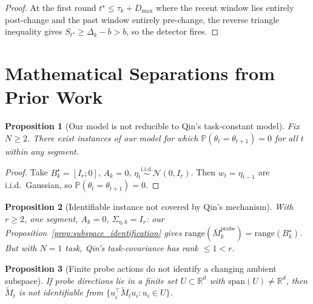 \documentclass{article}
\newcommand{\R}{\mathbb{R}}
\newcommand{\Prob}{\mathbb{P}}
\newcommand{\range}{\mathrm{range}}
\newcommand{\Span}{\mathrm{span}}
\newtheorem{proposition}{Proposition}
\begin{document}
\begin{proof}
At the first round $t^\star \le \tau_k + D_{\max}$ where the recent window lies entirely post-change and the past window entirely pre-change, the reverse triangle inequality gives $S_{t^\star} \ge \Delta_k - b > b$, so the detector fires.
\end{proof}

\section{Mathematical Separations from Prior Work}
\label{app:separation}

\begin{proposition}[Our model is not reducible to Qin's task-constant model]
\label{prop:separation_qin_1}
Fix $N\ge 2$. There exist instances of our model for which $\Prob(\theta_t = \theta_{t+1}) = 0$ for all $t$ within any segment.
\end{proposition}

\begin{proof}
Take $B_k^\star = [I_r; 0]$, $A_k = 0$, $\eta_t \stackrel{\mathrm{i.i.d.}}{\sim} \mathcal N(0,I_r)$.
Then $w_t = \eta_{t-1}$ are i.i.d.\ Gaussian, so $\Prob(\theta_t = \theta_{t+1}) = 0$.
\end{proof}

\begin{proposition}[Identifiable instance not covered by Qin's mechanism]
\label{prop:separation_qin_2}
With $r\ge 2$, one segment, $A_k = 0$, $\Sigma_{\eta,k} = I_r$: our Proposition~\ref{prop:subspace_identification} gives $\range(\bar M_k^{\mathrm{probe}})=\range(B_k^\star)$.
But with $N=1$ task, Qin's task-covariance has rank $\le 1 < r$.
\end{proposition}

\begin{proposition}[Finite probe actions do not identify a changing ambient subspace]
\label{prop:separation_elu_1}
If probe directions lie in a finite set $U \subset \R^d$ with $\Span(U) \neq \R^d$, then $\widetilde M_t$ is not identifiable from $\{u_i^\top \widetilde M_t u_i : u_i \in U\}$.
\end{proposition}

\end{document}
